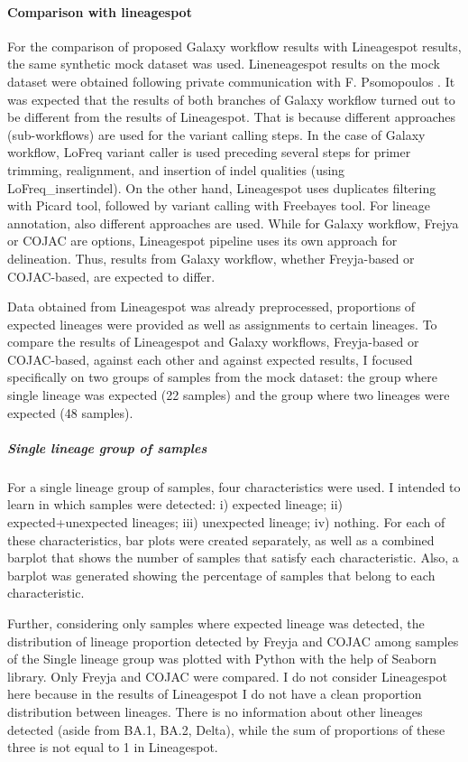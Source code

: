                 
            \paragraph{Comparison with lineagespot} \label{sec:methods:evaluation:mock:compare-ls}
            For the comparison of proposed Galaxy workflow results with Lineagespot results, the same synthetic mock dataset was used. Lineneagespot results on the mock dataset were obtained following private communication with F. Psomopoulos \cite{pechlivanis2022}. It was expected that the results of both branches of Galaxy workflow turned out to be different from the results of Lineagespot. That is because different approaches (sub-workflows) are used for the variant calling steps. In the case of Galaxy workflow, LoFreq variant caller is used preceding several steps for primer trimming, realignment, and insertion of indel qualities (using LoFreq\_insertindel). On the other hand, Lineagespot uses duplicates filtering with Picard tool, followed by variant calling with Freebayes tool. For lineage annotation, also different approaches are used. While for Galaxy workflow, Frejya or COJAC are options, Lineagespot pipeline uses its own approach for delineation. Thus, results from Galaxy workflow, whether Freyja-based or COJAC-based, are expected to differ.

            Data obtained from Lineagespot was already preprocessed, proportions of expected lineages were provided as well as assignments to certain lineages. To compare the results of Lineagespot and Galaxy workflows, Freyja-based or COJAC-based, against each other and against expected results, I focused specifically on two groups of samples from the mock dataset: the group where single lineage was expected (22 samples) and the group where two lineages were expected (48 samples). 

            
                \subparagraph{Single lineage group of samples} 
                For a single lineage group of samples, four characteristics were used. I intended to learn in which samples were detected: i) expected lineage; ii) expected+unexpected lineages; iii) unexpected lineage; iv) nothing. For each of these characteristics, bar plots were created separately, as well as a combined barplot that shows the number of samples that satisfy each characteristic. Also, a barplot was generated showing the percentage of samples that belong to each characteristic.

                Further, considering only samples where expected lineage was detected, the distribution of lineage proportion detected by Freyja and COJAC among samples of the Single lineage group was plotted with Python with the help of Seaborn library. Only Freyja and COJAC were compared. I do not consider Lineagespot here because in the results of Lineagespot I do not have a clean proportion distribution between lineages. There is no information about other lineages detected (aside from BA.1, BA.2, Delta), while the sum of proportions of these three is not equal to 1 in Lineagespot.
                
